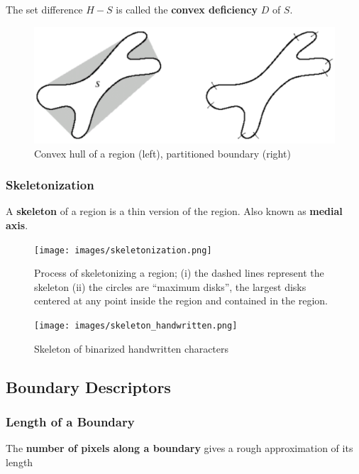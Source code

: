 The set difference $H - S$ is called the \textbf{convex deficiency} $D$ of $S$.

\begin{figure}[H]
  \centering
  \includegraphics[width=\linewidth]{images/convex_hull_boundary_segments.png}
  \caption{Convex hull of a region (left), partitioned boundary (right)}
\end{figure}

\subsubsection*{Skeletonization}

A \textbf{skeleton} of a region is a thin version of the region. Also
known as \textbf{medial axis}.

\begin{figure}[H]
  \centering
  \texttt{[image: images/skeletonization.png]}
  \caption{Process of skeletonizing a region; (i) the dashed lines
    represent the skeleton (ii) the circles are \enquote{maximum
    disks}, the largest disks centered at any point inside the region
  and contained in the region.}
\end{figure}

\begin{figure}[H]
  \centering
  \texttt{[image: images/skeleton\_handwritten.png]}
  \caption{Skeleton of binarized handwritten characters}
\end{figure}

\subsection*{Boundary Descriptors}

\subsubsection*{Length of a Boundary}

The \textbf{number of pixels along a boundary} gives a rough
approximation of its length

